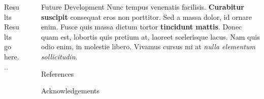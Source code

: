 \documentclass[final]{beamer}
\newlength{\sepwid}
\newlength{\onecolwid}
\newlength{\twocolwid}
\begin{document}
\begin{frame}[t]
\begin{columns}[t]
\begin{column}{\twocolwid}
\begin{columns}[t,totalwidth=\twocolwid]
\end{columns} 

	\begin{block}{Results}
		Results go here...
	\end{block}

\end{column}

\begin{column}{\sepwid}\end{column}

\begin{column}{\onecolwid}

	\begin{block}{Future Development}
		Nunc tempus venenatis facilisis. \textbf{Curabitur suscipit} consequat eros non porttitor. Sed a massa dolor, id ornare enim. Fusce quis massa dictum tortor \textbf{tincidunt mattis}. Donec quam est, lobortis quis pretium at, laoreet scelerisque lacus. Nam quis odio enim, in molestie libero. Vivamus cursus mi at \textit{nulla elementum sollicitudin}.
	\end{block}


	\begin{block}{References}
		\nocite{*}
		\small{\vspace{0.75in}}
	\end{block}

	\begin{block}{Acknowledgements}
		\small{}
	\end{block}

\end{column}

\end{columns}
\end{frame}
\end{document}
